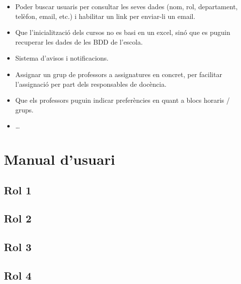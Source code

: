 \documentclass[a4paper,12pt]{ThesisStyle}
\begin{document}
\begin{itemize}
  \item Poder buscar usuaris per consultar les seves dades (nom, rol, departament, telèfon, email, etc.) i habilitar un link per enviar-li un email.
  \item Que l'inicialització dels cursos no es basi en un excel, sinó que es puguin recuperar les dades de les BDD de l'escola.
  \item Sistema d'avisos i notificacions.
  \item Assignar un grup de professors a assignatures en concret, per facilitar l'assignació per part dels responsables de docència.
  \item Que els professors puguin indicar preferències en quant a blocs horaris / grups.
  \item \ldots
\end{itemize}


\backmatter





%

\chapter*{Manual d'usuari}

\section*{Rol 1}



\section*{Rol 2}



\section*{Rol 3}



\section*{Rol 4}
\end{document}
